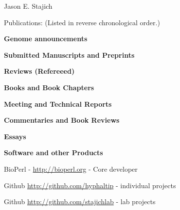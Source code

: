 \documentclass[10pt]{article}
\begin{document}
\begin{cv}{\centerline{Jason E. Stajich}}
\begin{cvlist}{Publications: (Listed in reverse chronological order.)}
\item \textbf{Genome announcements}
  
\item \textbf{Submitted Manuscripts and Preprints}
  
\item \textbf{Reviews (Refereeed)}

  \item \textbf{Books and Book Chapters} 


\item \textbf{Meeting and Technical Reports}


\item \textbf{Commentaries and Book Reviews}

  
\item \textbf{Essays}
  
\begin{cvlistcompact}{\bf Software and other Products}
  \item BioPerl - \url{http://bioperl.org} - Core developer
\item Github \url{http://github.com/hyphaltip} - individual
  projects
\item Github \url{http://github.com/stajichlab} - lab
  projects


\end{cvlistcompact}
\end{cvlist}
\end{cv}
\end{document}

